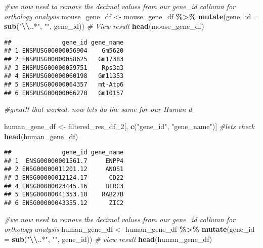 \documentclass[
]{article}
\newenvironment{Shaded}{\begin{snugshade}}{\end{snugshade}}
\newcommand{\AttributeTok}[1]{\textcolor[rgb]{0.13,0.29,0.53}{#1}}
\newcommand{\CommentTok}[1]{\textcolor[rgb]{0.56,0.35,0.01}{\textit{#1}}}
\newcommand{\FunctionTok}[1]{\textcolor[rgb]{0.13,0.29,0.53}{\textbf{#1}}}
\newcommand{\NormalTok}[1]{#1}
\newcommand{\OtherTok}[1]{\textcolor[rgb]{0.56,0.35,0.01}{#1}}
\newcommand{\SpecialCharTok}[1]{\textcolor[rgb]{0.81,0.36,0.00}{\textbf{#1}}}
\newcommand{\StringTok}[1]{\textcolor[rgb]{0.31,0.60,0.02}{#1}}
\begin{document}
\begin{Shaded}
\begin{Highlighting}[]
\CommentTok{\#we now need to remove the decimal values from our gene\_id collumn for orthology analysis}
\NormalTok{mouse\_gene\_df }\OtherTok{\textless{}{-}}\NormalTok{ mouse\_gene\_df }\SpecialCharTok{\%\textgreater{}\%}
  \FunctionTok{mutate}\NormalTok{(}\AttributeTok{gene\_id =} \FunctionTok{sub}\NormalTok{(}\StringTok{"}\SpecialCharTok{\textbackslash{}\textbackslash{}}\StringTok{..*"}\NormalTok{, }\StringTok{""}\NormalTok{, gene\_id))}
\CommentTok{\# View result}
\FunctionTok{head}\NormalTok{(mouse\_gene\_df)}
\end{Highlighting}
\end{Shaded}

\begin{verbatim}
##              gene_id gene_name
## 1 ENSMUSG00000056904    Gm5620
## 2 ENSMUSG00000058625   Gm17383
## 3 ENSMUSG00000059751    Rps3a3
## 4 ENSMUSG00000060198   Gm11353
## 5 ENSMUSG00000064357   mt-Atp6
## 6 ENSMUSG00000066270   Gm10157
\end{verbatim}

\begin{Shaded}
\begin{Highlighting}[]
\CommentTok{\#great!! that worked. now lets do the same for our Human d}
\end{Highlighting}
\end{Shaded}

\begin{Shaded}
\begin{Highlighting}[]
\NormalTok{human\_gene\_df }\OtherTok{\textless{}{-}}\NormalTok{ filtered\_res\_df\_2[, }\FunctionTok{c}\NormalTok{(}\StringTok{"gene\_id"}\NormalTok{, }\StringTok{"gene\_name"}\NormalTok{)]}
\CommentTok{\#lets check}
\FunctionTok{head}\NormalTok{(human\_gene\_df)}
\end{Highlighting}
\end{Shaded}

\begin{verbatim}
##              gene_id gene_name
## 1  ENSG00000001561.7     ENPP4
## 2 ENSG00000011201.12     ANOS1
## 3 ENSG00000012124.17      CD22
## 4 ENSG00000023445.16     BIRC3
## 5 ENSG00000041353.10    RAB27B
## 6 ENSG00000043355.12      ZIC2
\end{verbatim}

\begin{Shaded}
\begin{Highlighting}[]
\CommentTok{\#we now need to remove the decimal values from our gene\_id collumn for orthology analysis}
\NormalTok{human\_gene\_df }\OtherTok{\textless{}{-}}\NormalTok{ human\_gene\_df }\SpecialCharTok{\%\textgreater{}\%}
  \FunctionTok{mutate}\NormalTok{(}\AttributeTok{gene\_id =} \FunctionTok{sub}\NormalTok{(}\StringTok{"}\SpecialCharTok{\textbackslash{}\textbackslash{}}\StringTok{..*"}\NormalTok{, }\StringTok{""}\NormalTok{, gene\_id))}
\CommentTok{\# view result}
\FunctionTok{head}\NormalTok{(human\_gene\_df)}
\end{Highlighting}
\end{Shaded}
\end{document}
